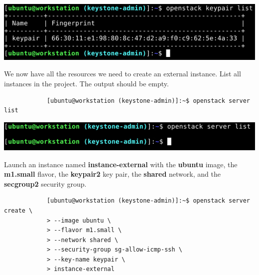 \documentclass[letterpaper, 12pt]{article}
\begin{document}
\begin{enumerate}
\begin{labstep}
        \begin{center}
            \includegraphics[width=\linewidth]{images/part9/step32.png}
        \end{center}
    \end{labstep}

    \begin{labstep}
        We now have all the resources we need to create an external instance.
        List all instances in the project.
        The output should be empty.
        \begin{lstlisting}
            [ubuntu@workstation (keystone-admin)]:~$ openstack server list
        \end{lstlisting}

        \begin{center}
            \includegraphics[width=\linewidth]{images/part9/step33.png}
        \end{center}
    \end{labstep}

    \begin{labstep}
        Launch an instance named \textbf{instance-external} with the \textbf{ubuntu} image, the \textbf{m1.small} flavor, the \textbf{keypair2} key pair, the \textbf{shared} network, and the \textbf{secgroup2} security group.
        \begin{lstlisting}
            [ubuntu@workstation (keystone-admin)]:~$ openstack server create \
            > --image ubuntu \
            > --flavor m1.small \
            > --network shared \
            > --security-group sg-allow-icmp-ssh \
            > --key-name keypair \
            > instance-external
        \end{lstlisting}


\end{labstep}
\end{enumerate}
\end{document}
